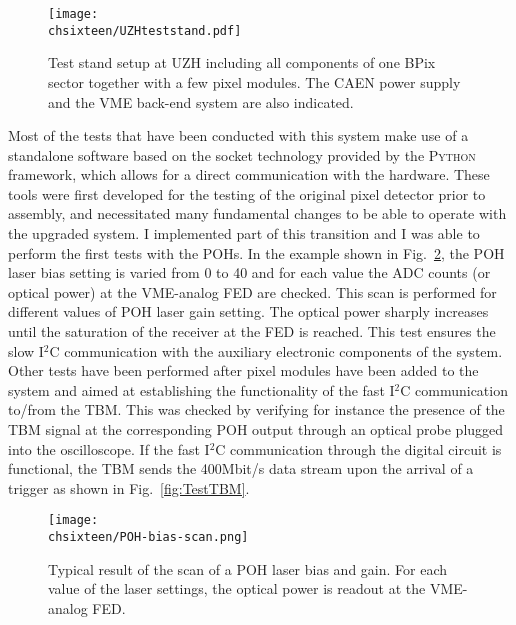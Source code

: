 \begin{figure}[!htb]
 \begin{center}
 \texttt{[image: \\chsixteen/UZHteststand.pdf]}
 \end{center}
 \caption{Test stand setup at UZH including all components of one BPix sector together with a few pixel modules. The CAEN power supply and the VME back-end system are also indicated.}
 \label{fig:TestStandUZH}
\end{figure} 

Most of the tests that have been conducted with this system make use of a standalone software based on the socket technology provided by the \textsc{Python} framework,
which allows for a direct communication with the hardware. 
These tools were first developed for the testing of the original pixel detector prior to assembly\cite{Caminada:2010gsa}, and necessitated many fundamental changes to be able to operate with the upgraded system.
I implemented part of this transition and I was able to perform the first tests with the POHs.
In the example shown in Fig.~\ref{fig:TestPOH}, the POH laser bias setting is varied from 0 to 40 and for each value the ADC counts (or optical power) at the VME-analog FED are checked.
This scan is performed for different values of POH laser gain setting.
The optical power sharply increases until the saturation of the receiver at the FED is reached.
This test ensures the slow I$^2$C communication with the auxiliary electronic components of the system.
Other tests have been performed after pixel modules have been added to the system and aimed at establishing the functionality of the fast I$^2$C communication to/from the TBM.
This was checked by verifying for instance the presence of the TBM signal at the corresponding POH output through an optical probe plugged into the oscilloscope.
If the fast I$^2$C communication through the digital circuit is functional, the TBM sends the 400\unit{Mbit/s} data stream upon the arrival of a trigger as shown in Fig.~\ref{fig:TestTBM}.

\begin{figure}[!htb]
 \begin{center}
  \texttt{[image: \\chsixteen/POH-bias-scan.png]}
 \end{center}
 \caption{Typical result of the scan of a POH laser bias and gain. For each value of the laser settings, the optical power is readout at the VME-analog FED.}
 \label{fig:TestPOH}
\end{figure} 

